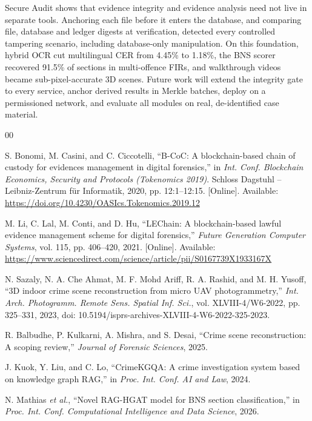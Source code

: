 \documentclass[conference]{IEEEtran}
\begin{document}
Secure Audit shows that evidence integrity and evidence analysis need not live in separate tools. Anchoring each file before it enters the database, and comparing file, database and ledger digests at verification, detected every controlled tampering scenario, including database-only manipulation. On this foundation, hybrid OCR cut multilingual CER from 4.45\% to 1.18\%, the BNS scorer recovered 91.5\% of sections in multi-offence FIRs, and walkthrough videos became sub-pixel-accurate 3D scenes. Future work will extend the integrity gate to every service, anchor derived results in Merkle batches, deploy on a permissioned network, and evaluate all modules on real, de-identified case material.

\balance
\begin{thebibliography}{00}
\footnotesize

 S. Bonomi, M. Casini, and C. Ciccotelli, ``B-CoC: A blockchain-based chain of custody for evidences management in digital forensics,'' in \textit{Int. Conf. Blockchain Economics, Security and Protocols (Tokenomics 2019)}. Schloss Dagstuhl -- Leibniz-Zentrum f\"ur Informatik, 2020, pp. 12:1--12:15. [Online]. Available: \url{https://doi.org/10.4230/OASIcs.Tokenomics.2019.12}

 M. Li, C. Lal, M. Conti, and D. Hu, ``LEChain: A blockchain-based lawful evidence management scheme for digital forensics,'' \textit{Future Generation Computer Systems}, vol. 115, pp. 406--420, 2021. [Online]. Available: \url{https://www.sciencedirect.com/science/article/pii/S0167739X1933167X}

 N. Sazaly, N. A. Che Ahmat, M. F. Mohd Ariff, R. A. Rashid, and M. H. Yusoff, ``3D indoor crime scene reconstruction from micro UAV photogrammetry,'' \textit{Int. Arch. Photogramm. Remote Sens. Spatial Inf. Sci.}, vol. XLVIII-4/W6-2022, pp. 325--331, 2023, doi: 10.5194/isprs-archives-XLVIII-4-W6-2022-325-2023.

 R. Balbudhe, P. Kulkarni, A. Mishra, and S. Desai, ``Crime scene reconstruction: A scoping review,'' \textit{Journal of Forensic Sciences}, 2025.

 J. Kuok, Y. Liu, and C. Lo, ``CrimeKGQA: A crime investigation system based on knowledge graph RAG,'' in \textit{Proc. Int. Conf. AI and Law}, 2024.

 N. Mathias \textit{et al.}, ``Novel RAG-HGAT model for BNS section classification,'' in \textit{Proc. Int. Conf. Computational Intelligence and Data Science}, 2026.


\end{thebibliography}
\end{document}
